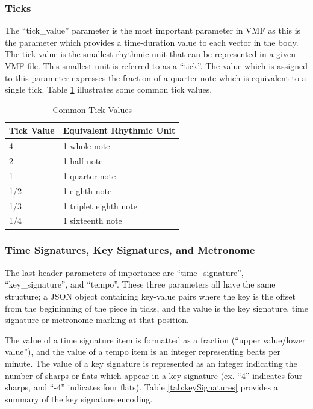 \subsubsection{Ticks}

The ``tick\_value'' parameter is the most important parameter in VMF as this is the parameter which provides a time-duration value to each vector in the body. The tick value is the smallest rhythmic unit that can be represented in a given VMF file. This smallest unit is referred to as a ``tick''. The value which is assigned to this parameter expresses the fraction of a quarter note which is equivalent to a single tick. Table \ref{tab:tickValues} illustrates some common tick values.

\begin{table}[h]
  \centering
  \begin{tabular}{ll}
  Tick Value & Equivalent Rhythmic Unit \\ \hline
  4          & 1 whole note             \\
  2          & 1 half note              \\
  1          & 1 quarter note           \\
  1/2        & 1 eighth note            \\
  1/3        & 1 triplet eighth note    \\
  1/4        & 1 sixteenth note        
  \end{tabular}
  \caption{Common Tick Values}
  \label{tab:tickValues}
\end{table}

\subsubsection{Time Signatures, Key Signatures, and Metronome}

The last header parameters of importance are ``time\_signature'', ``key\_signature'', and ``tempo''. These three parameters all have the same structure; a JSON object containing key-value pairs where the key is the offset from the begininning of the piece in ticks, and the value is the key signature, time signature or metronome marking at that position.

The value of a time signature item is formatted as a fraction (``upper value/lower value''), and the value of a tempo item is an integer representing beats per minute. The value of a key signature is represented as an integer indicating the number of sharps or flats which appear in a key signature (ex. ``4'' indicates four sharps, and ``-4'' indicates four flats). Table \ref{tab:keySignatures} provides a summary of the key signature encoding.

